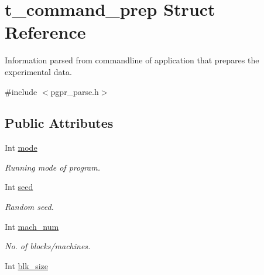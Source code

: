 \hypertarget{structt__command__prep}{\section{t\-\_\-command\-\_\-prep Struct Reference}
\label{structt__command__prep}
}


Information parsed from commandline of application that prepares the experimental data.  




{\ttfamily \#include $<$pgpr\-\_\-parse.\-h$>$}

\subsection*{Public Attributes}
\begin{DoxyCompactItemize}
\item 
\hypertarget{structt__command__prep_a157a7013d31723e9e83ee5edd790a9c2}{Int \hyperlink{structt__command__prep_a157a7013d31723e9e83ee5edd790a9c2}{mode}}\label{structt__command__prep_a157a7013d31723e9e83ee5edd790a9c2}

\begin{DoxyCompactList}\small\item\em Running mode of program. \end{DoxyCompactList}\item 
\hypertarget{structt__command__prep_a5ea7d62fa1431439c77ff1be76a2803b}{Int \hyperlink{structt__command__prep_a5ea7d62fa1431439c77ff1be76a2803b}{seed}}\label{structt__command__prep_a5ea7d62fa1431439c77ff1be76a2803b}

\begin{DoxyCompactList}\small\item\em Random seed. \end{DoxyCompactList}\item 
\hypertarget{structt__command__prep_ae291868f188ef559477de77a0c09b779}{Int \hyperlink{structt__command__prep_ae291868f188ef559477de77a0c09b779}{mach\-\_\-num}}\label{structt__command__prep_ae291868f188ef559477de77a0c09b779}

\begin{DoxyCompactList}\small\item\em No. of blocks/machines. \end{DoxyCompactList}\item 
\hypertarget{structt__command__prep_a854d30f09e6966153b6aad01be20ba75}{Int \hyperlink{structt__command__prep_a854d30f09e6966153b6aad01be20ba75}{blk\-\_\-size}}\label{structt__command__prep_a854d30f09e6966153b6aad01be20ba75}


\end{DoxyCompactItemize}
